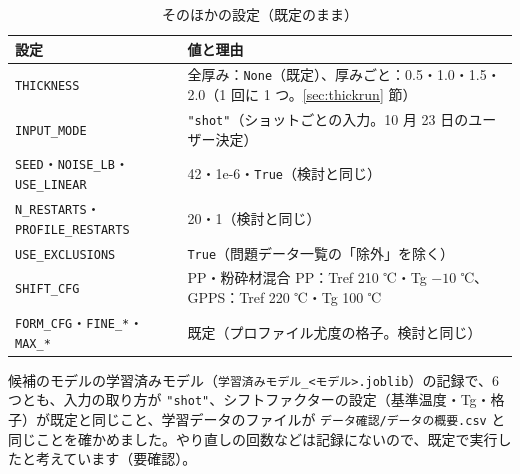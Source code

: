 \documentclass[paper=a4paper,fontsize=10.5pt,line_length=44zw,number_of_lines=40]{jlreq}
\begin{document}
\begin{table}[H]\centering\footnotesize
\caption{そのほかの設定（既定のまま）}\label{tab:other}
\begin{tabular}{lp{25\zw}}
\toprule
設定 & 値と理由 \\
\midrule
\texttt{THICKNESS} & 全厚み：\texttt{None}（既定）、厚みごと：0.5・1.0・1.5・2.0（1 回に 1 つ。\ref{sec:thickrun} 節） \\
\texttt{INPUT\_\allowbreak{}MODE} & \texttt{"shot"}（ショットごとの入力。10 月 23 日のユーザー決定） \\
\texttt{SEED}・\texttt{NOISE\_\allowbreak{}LB}・\texttt{USE\_\allowbreak{}LINEAR} & 42・1e-6・\texttt{True}（検討と同じ） \\
\texttt{N\_\allowbreak{}RESTARTS}・\texttt{PROFILE\_\allowbreak{}RESTARTS} & 20・1（検討と同じ） \\
\texttt{USE\_\allowbreak{}EXCLUSIONS} & \texttt{True}（問題データ一覧の「除外」を除く） \\
\texttt{SHIFT\_\allowbreak{}CFG} & PP・粉砕材混合 PP：Tref 210 ℃・Tg $-10$ ℃、GPPS：Tref 220 ℃・Tg 100 ℃ \\
\texttt{FORM\_\allowbreak{}CFG}・\texttt{FINE\_\allowbreak{}*}・\texttt{MAX\_\allowbreak{}*} & 既定（プロファイル尤度の格子。検討と同じ） \\
\bottomrule
\end{tabular}
\end{table}
候補のモデルの学習済みモデル（\texttt{学習済みモデル\_\allowbreak{}<モデル>.joblib}）の記録で、6 つとも、入力の取り方が \texttt{"shot"}、シフトファクターの設定（基準温度・Tg・格子）が既定と同じこと、学習データのファイルが \texttt{データ確認/\allowbreak{}データの概要.csv} と同じことを確かめました。やり直しの回数などは記録にないので、既定で実行したと考えています（要確認）。
\end{document}
